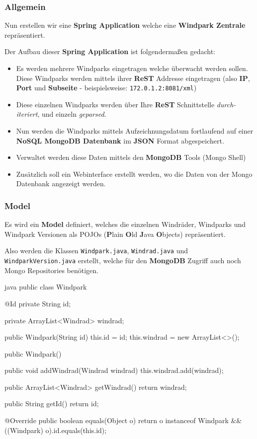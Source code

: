\subsubsection{Allgemein}

Nun erstellen wir eine \textbf{Spring Application} welche eine \textbf{Windpark Zentrale} repräsentiert.

Der Aufbau dieser \textbf{Spring Application} ist folgendermaßen gedacht:

\begin{itemize}
    \item Es werden mehrere Windparks eingetragen welche überwacht werden sollen. Diese Windparks werden mittels ihrer \textbf{ReST} Addresse eingetragen (also \textbf{IP}, \textbf{Port} und \textbf{Subseite} - beispielsweise: \texttt{172.0.1.2:8081/xml})
    \item Diese einzelnen Windparks werden über Ihre \textbf{ReST} Schnittstelle \textit{durch-iteriert}, und einzeln \textit{geparsed}.
    \item Nun werden die Windparks mittels Aufzeichnungsdatum fortlaufend auf einer \textbf{NoSQL MongoDB Datenbank} im \textbf{JSON} Format abgespeichert.
    \item Verwaltet werden diese Daten mittels den \textbf{MongoDB} Tools (Mongo Shell)
    \item Zusätzlich soll ein Webinterface erstellt werden, wo die Daten von der Mongo Datenbank angezeigt werden.
\end{itemize}

\subsubsection{Model}

Es wird ein \textbf{Model} definiert, welches die einzelnen Windräder, Windparks und Windpark Versionen als POJOs (\textbf{P}lain \textbf{O}ld \textbf{J}ava \textbf{O}bjects) repräsentiert.

Also werden die Klassen \texttt{Windpark.java}, \texttt{Windrad.java} und \texttt{WindparkVersion.java} erstellt, welche für den \textbf{MongoDB} Zugriff auch noch Mongo Repositories benötigen.

\begin{code}{java}
    public class Windpark {
        @Id
        private String id;

        private ArrayList<Windrad> windrad;

        public Windpark(String id) {
            this.id = id;
            this.windrad = new ArrayList<>();
        }

        public Windpark() {
        }

        public void addWindrad(Windrad windrad){
            this.windrad.add(windrad);
        }

        public ArrayList<Windrad> getWindrad() {
            return windrad;
        }

        public String getId() {
            return id;
        }

        @Override
        public boolean equals(Object o) {
            return o instanceof Windpark && ((Windpark) o).id.equals(this.id);
        }
    }
\end{code}

